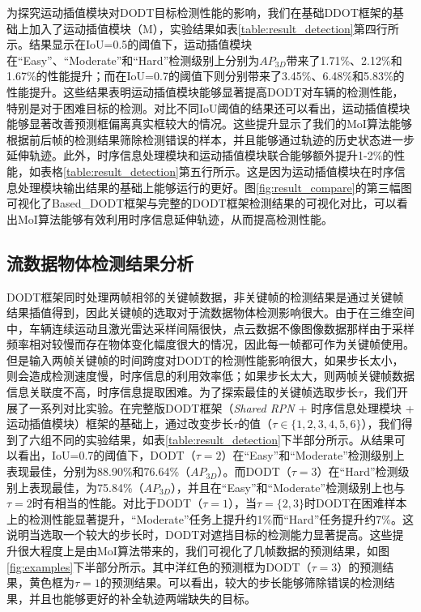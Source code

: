 为探究运动插值模块对DODT目标检测性能的影响，我们在基础DDOT框架的基础上加入了运动插值模块（M），实验结果如表\ref{table:result_detection}第四行所示。结果显示在IoU=0.5的阈值下，运动插值模块在“Easy”、“Moderate”和“Hard”检测级别上分别为$AP_{3D}$带来了1.71\%、2.12\%和1.67\%的性能提升；而在IoU=0.7的阈值下则分别带来了3.45\%、6.48\%和5.83\%的性能提升。这些结果表明运动插值模块能够显著提高DODT对车辆的检测性能，特别是对于困难目标的检测。对比不同IoU阈值的结果还可以看出，运动插值模块能够显著改善预测框偏离真实框较大的情况。这些提升显示了我们的MoI算法能够根据前后帧的检测结果筛除检测错误的样本，并且能够通过轨迹的历史状态进一步延伸轨迹。此外，时序信息处理模块和运动插值模块联合能够额外提升1-2\%的性能，如表格\ref{table:result_detection}第五行所示。这是因为运动插值模块在时序信息处理模块输出结果的基础上能够运行的更好。图\ref{fig:result_compare}的第三幅图可视化了Based\_DODT框架与完整的DODT框架检测结果的可视化对比，可以看出MoI算法能够有效利用时序信息延伸轨迹，从而提高检测性能。



\subsection{流数据物体检测结果分析}
\label{stream_result}



DODT框架同时处理两帧相邻的关键帧数据，非关键帧的检测结果是通过关键帧结果插值得到，因此关键帧的选取对于流数据物体检测影响很大。由于在三维空间中，车辆连续运动且激光雷达采样间隔很快，点云数据不像图像数据那样由于采样频率相对较慢而存在物体变化幅度很大的情况，因此每一帧都可作为关键帧使用。但是输入两帧关键帧的时间跨度对DODT的检测性能影响很大，如果步长太小，则会造成检测速度慢，时序信息的利用效率低；如果步长太大，则两帧关键帧数据信息关联度不高，时序信息提取困难。为了探索最佳的关键帧选取步长$\tau$，我们开展了一系列对比实验。在完整版DODT框架（\textit{Shared RPN} + 时序信息处理模块 + 运动插值模块）框架的基础上，通过改变步长$\tau$的值（$\tau \in \{1,2,3,4,5,6\}$），我们得到了六组不同的实验结果，如表\ref{table:result_detection}下半部分所示。从结果可以看出，IoU=0.7的阈值下，DODT（$\tau = 2$）在“Easy”和“Moderate”检测级别上表现最佳，分别为88.90\%和76.64\%（$AP_{3D}$）。而DODT（$\tau = 3$）在“Hard”检测级别上表现最佳，为75.84\%（$AP_{3D}$），并且在“Easy”和“Moderate”检测级别上也与$\tau = 2$时有相当的性能。对比于DODT（$\tau = 1$），当$\tau = \{2,3\}$时DODT在困难样本上的检测性能显著提升，“Moderate”任务上提升约1\%而“Hard”任务提升约7\%。这说明当选取一个较大的步长时，DODT对遮挡目标的检测能力显著提高。这些提升很大程度上是由MoI算法带来的，我们可视化了几帧数据的预测结果，如图\ref{fig:examples}下半部分所示。其中洋红色的预测框为DODT（$\tau=3$）的预测结果，黄色框为$\tau = 1$的预测结果。可以看出，较大的步长能够筛除错误的检测结果，并且也能够更好的补全轨迹两端缺失的目标。

